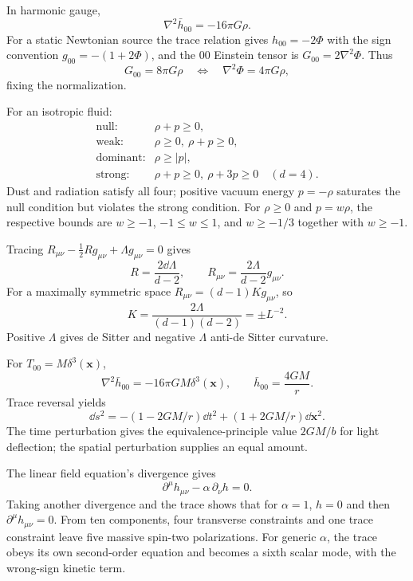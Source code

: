 \begin{solution}
In harmonic gauge,
\[
\nabla^2\bar h_{00}=-16\pi G\rho.
\]
For a static Newtonian source the trace relation gives
\(h_{00}=-2\Phi\) with the sign convention
\(g_{00}=-(1+2\Phi)\), and the \(00\) Einstein tensor is
\(G_{00}=2\nabla^2\Phi\).  Thus
\[
G_{00}=8\pi G\rho
\quad\Longleftrightarrow\quad
\nabla^2\Phi=4\pi G\rho,
\]
fixing the normalization.
\end{solution}

\begin{solution}
For an isotropic fluid:
\[
\begin{array}{ll}
\text{null:}&\rho+p\geq0,\\
\text{weak:}&\rho\geq0,\ \rho+p\geq0,\\
\text{dominant:}&\rho\geq|p|,\\
\text{strong:}&\rho+p\geq0,\ \rho+3p\geq0
\quad(d=4).
\end{array}
\]
Dust and radiation satisfy all four; positive vacuum energy
\(p=-\rho\) saturates the null condition but violates the strong condition.
For \(\rho\geq0\) and \(p=w\rho\), the respective bounds are
\(w\geq-1\), \(-1\leq w\leq1\), and \(w\geq-1/3\) together with \(w\geq-1\).
\end{solution}

\begin{solution}
Tracing
\(R_{\mu\nu}-\tfrac12Rg_{\mu\nu}+\Lambda g_{\mu\nu}=0\) gives
\[
R=\frac{2\dd\Lambda}{d-2},\qquad
R_{\mu\nu}=\frac{2\Lambda}{d-2}g_{\mu\nu}.
\]
For a maximally symmetric space
\(R_{\mu\nu}=(d-1)K g_{\mu\nu}\), so
\[
K=\frac{2\Lambda}{(d-1)(d-2)}=\pm L^{-2}.
\]
Positive \(\Lambda\) gives de Sitter and negative \(\Lambda\) anti-de Sitter
curvature.
\end{solution}

\begin{solution}
For \(T_{00}=M\delta^3(\bm x)\),
\[
\nabla^2\bar h_{00}=-16\pi GM\delta^3(\bm x),
\qquad
\bar h_{00}=\frac{4GM}{r}.
\]
Trace reversal yields
\[
\dd s^2=-(1-2GM/r)\dd t^2
+(1+2GM/r)\dd\bm x^2.
\]
The time perturbation gives the equivalence-principle value \(2GM/b\) for
light deflection; the spatial perturbation supplies an equal amount.
\end{solution}

\begin{solution}
The linear field equation's divergence gives
\[
\partial^\mu h_{\mu\nu}-\alpha\,\partial_\nu h=0.
\]
Taking another divergence and the trace shows that for \(\alpha=1\),
\(h=0\) and then \(\partial^\mu h_{\mu\nu}=0\).  From ten components, four
transverse constraints and one trace constraint leave five massive spin-two
polarizations.  For generic \(\alpha\), the trace obeys its own second-order
equation and becomes a sixth scalar mode, with the wrong-sign kinetic term.
\end{solution}

